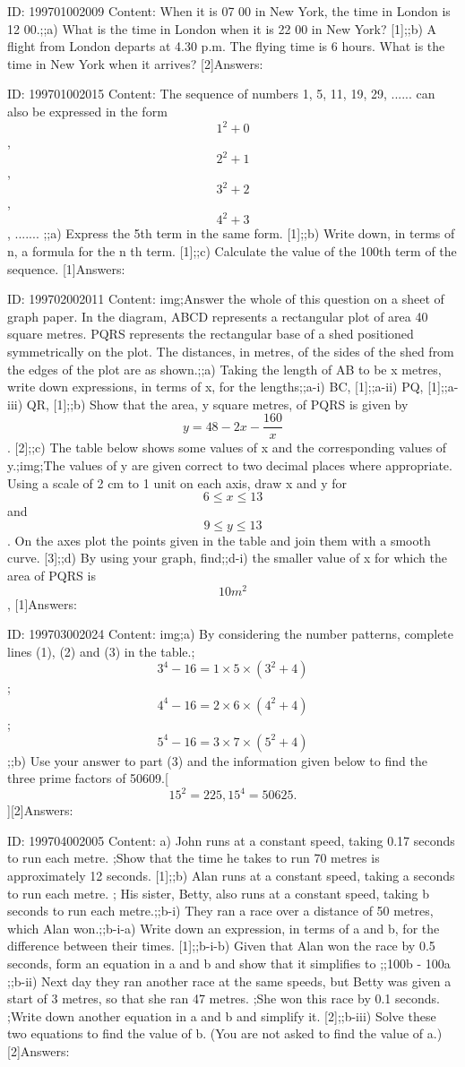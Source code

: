\documentclass{article}
\begin{document}
ID: 199701002009
Content:
When it is 07 00 in New York, the time in London is 12 00.;;a) What is the time in London when it is 22 00 in New York? [1];;b) A flight from London departs at 4.30 p.m. The flying time is 6 hours. What is the time in New York when it arrives? [2]Answers:

ID: 199701002015
Content:
The sequence of numbers 1, 5, 11, 19, 29, ...... can also be expressed in the form $$1^2 + 0$$, $$2^2+1$$, $$3^2+2$$,   $$4^2+3$$, ....... ;;a) Express the 5th term in the same form. [1];;b) Write down, in terms of n, a formula for the n th term. [1];;c) Calculate the value of the 100th term of the sequence. [1]Answers:

ID: 199702002011
Content:
img;Answer the whole of this question on a sheet of graph paper. In the diagram, ABCD represents a rectangular plot of area 40 square metres. PQRS represents the rectangular base of a shed positioned symmetrically on the plot. The distances, in metres, of the sides of the shed from the edges of the plot are as shown.;;a) Taking the length of AB to be x metres, write down expressions, in terms of x, for the lengths;;a-i) BC, [1];;a-ii) PQ, [1];;a-iii) QR, [1];;b) Show that the area, y square metres, of PQRS is given by $$y=48-2x-\frac{160}{x}$$. [2];;c) The table below shows some values of x and the corresponding values of y.;img;The values of y are given correct to two decimal places where appropriate. Using a scale of 2 cm to 1 unit on each axis, draw x and y for $$6\leq x\leq 13$$ and $$9\leq y\leq 13$$. On the axes plot the points given in the table and join them with a smooth curve. [3];;d) By using your graph, find;;d-i) the smaller value of x for which the area of PQRS is $$10m^2$$, [1]Answers:

ID: 199703002024
Content:
img;a) By considering the number patterns, complete lines (1), (2) and (3) in the table.;$$3^4-16=1 \times 5 \times (3^2+4)$$;$$4^4-16=2 \times 6 \times (4^2+4)$$;$$5^4-16=3 \times 7 \times (5^2+4)$$;;b) Use your answer to part (3) and the information given below to find the three prime factors of 50609.[$$15^2=225, 15^4= 50625.$$][2]Answers:

ID: 199704002005
Content:
a) John runs at a constant speed, taking 0.17 seconds to run each metre. ;Show that the time he takes to run 70 metres is approximately 12 seconds. [1];;b) Alan runs at a constant speed, taking a seconds to run each metre. ; His sister, Betty, also runs at a constant speed, taking b seconds to run each metre.;;b-i) They ran a race over a distance of 50 metres, which Alan won.;;b-i-a) Write down an expression, in terms of a and b, for the difference between their times. [1];;b-i-b) Given that Alan won the race by 0.5 seconds, form an equation in a and b and show that it simplifies to ;;100b - 100a ;;b-ii) Next day they ran another race at the same speeds, but Betty was given a start of 3 metres, so that she ran 47 metres. ;She won this race by 0.1 seconds. ;Write down another equation in a and b and simplify it. [2];;b-iii) Solve these two equations to find the value of b. (You are not asked to find the value of a.) [2]Answers:
\end{document}
